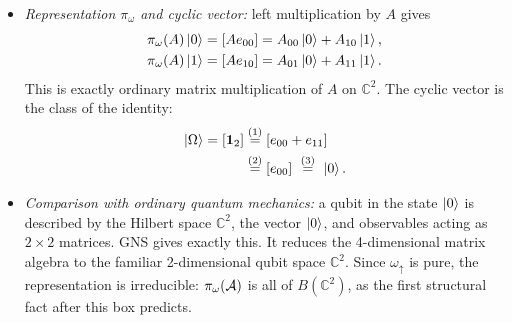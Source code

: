 \begin{workedexamplebox}
\begin{enumerate}[leftmargin=*]
\begin{itemize}[leftmargin=*]
So the quotient space is 2-dimensional. Define the basis
\[
\ket{0} \equiv [e_{00}], \qquad \ket{1} \equiv [e_{10}] .
\]
Its inner products are $\braket{0|0} = 1$, $\braket{1|1} = 1$, $\braket{0|1} = 0$, so it is orthonormal, and
$\HH_\omega \cong \mathbb{C}^2$.
\item \emph{Representation $\pi_\omega$ and cyclic vector:} left multiplication by $A$ gives
\begin{align}
\pi_\omega(A)\ket{0} &= [A e_{00}] = A_{00}\ket{0} + A_{10}\ket{1}, \notag\\
\pi_\omega(A)\ket{1} &= [A e_{10}] = A_{01}\ket{0} + A_{11}\ket{1} . \notag
\end{align}
This is exactly ordinary matrix multiplication of $A$ on $\mathbb{C}^2$. The cyclic vector is the class of
the identity:
\begin{align}
\ket\Omega = [\mathbf{1}_2]
&\overset{(1)}{=} [e_{00} + e_{11}] \notag\\
&\overset{(2)}{=} [e_{00}]
\ \overset{(3)}{=}\ \ket{0} . \notag
\end{align}
\quad
{}\quad
{}

\item \emph{Comparison with ordinary quantum mechanics:} a qubit in the state $\ket0$ is described by the
Hilbert space $\mathbb C^2$, the vector $\ket0$, and observables acting as $2\times2$ matrices. GNS gives
exactly this. It reduces the 4-dimensional matrix algebra to the familiar 2-dimensional qubit space
$\mathbb{C}^2$. Since $\omega_\uparrow$ is pure, the representation is irreducible: $\pi_\omega(\mathcal{A})$ is all
of $B(\mathbb C^2)$, as the first structural fact after this box predicts.
\end{itemize}


\end{enumerate}
\end{workedexamplebox}
